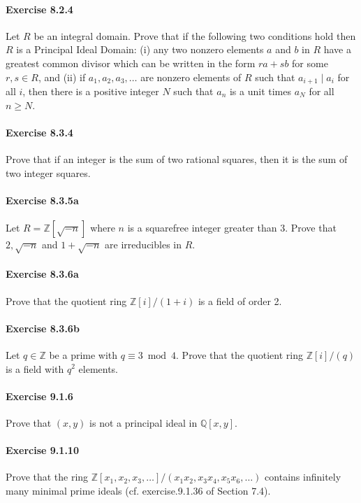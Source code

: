 \documentclass{article}
\begin{document}
\paragraph{Exercise 8.2.4} Let $R$ be an integral domain. Prove that if the following two conditions hold then $R$ is a Principal Ideal Domain: (i) any two nonzero elements $a$ and $b$ in $R$ have a greatest common divisor which can be written in the form $r a+s b$ for some $r, s \in R$, and (ii) if $a_{1}, a_{2}, a_{3}, \ldots$ are nonzero elements of $R$ such that $a_{i+1} \mid a_{i}$ for all $i$, then there is a positive integer $N$ such that $a_{n}$ is a unit times $a_{N}$ for all $n \geq N$.

\paragraph{Exercise 8.3.4} Prove that if an integer is the sum of two rational squares, then it is the sum of two integer squares.

\paragraph{Exercise 8.3.5a} Let $R=\mathbb{Z}[\sqrt{-n}]$ where $n$ is a squarefree integer greater than 3. Prove that $2, \sqrt{-n}$ and $1+\sqrt{-n}$ are irreducibles in $R$.

\paragraph{Exercise 8.3.6a} Prove that the quotient ring $\mathbb{Z}[i] /(1+i)$ is a field of order 2.

\paragraph{Exercise 8.3.6b} Let $q \in \mathbb{Z}$ be a prime with $q \equiv 3 \bmod 4$. Prove that the quotient ring $\mathbb{Z}[i] /(q)$ is a field with $q^{2}$ elements.

\paragraph{Exercise 9.1.6} Prove that $(x, y)$ is not a principal ideal in $\mathbb{Q}[x, y]$.

\paragraph{Exercise 9.1.10} Prove that the ring $\mathbb{Z}\left[x_{1}, x_{2}, x_{3}, \ldots\right] /\left(x_{1} x_{2}, x_{3} x_{4}, x_{5} x_{6}, \ldots\right)$ contains infinitely many minimal prime ideals (cf. exercise.9.1.36 of Section 7.4).
\end{document}

